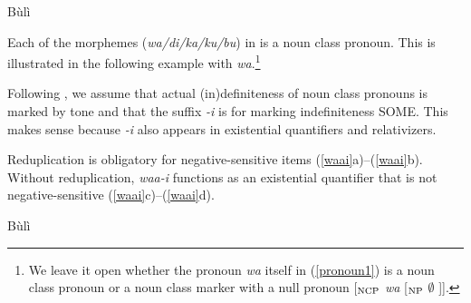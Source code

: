 \documentclass[output=paper,colorlinks,citecolor=brown]{langscibook}
\begin{document}
\ea Bùlì
\z
\z


Each of the morphemes (\textit{wa/di/ka/ku/bu}) in  is a noun class pronoun. This is illustrated in the following example with \textit{wa}.\footnote{We leave it open whether the pronoun \textit{wa} itself in (\ref{pronoun1}) is a noun class pronoun or a noun class marker with a null pronoun [$_{\textup{NCP}}$ \textit{wa} [$_{\textup{NP}}$ $\emptyset$ ]].}

{}
\z

Following \cite{HiraiwaEtAl2017}, we assume that actual (in)definiteness of noun class pronouns is marked by tone and that the suffix \textit{-i} is for marking indefiniteness SOME. This makes sense because \textit{-i} also appears in existential quantifiers and relativizers.

\z

\z

Reduplication is obligatory for negative-sensitive items (\ref{waai}a)--(\ref{waai}b). Without reduplication, \textit{waa-i} functions as an existential quantifier that is not negative-sensitive (\ref{waai}c)--(\ref{waai}d).


\ea Bùlì \label{waai}
\z
\z
\end{document}

